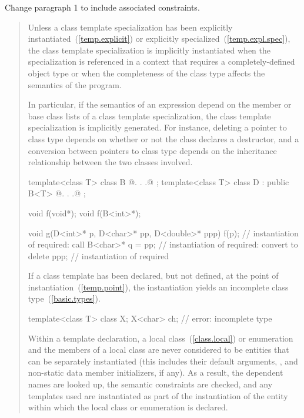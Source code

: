 Change paragraph 1 to include associated constraints.

\begin{quote}
\pnum
Unless a class template specialization has been explicitly
instantiated~(\ref{temp.explicit}) or explicitly
specialized~(\ref{temp.expl.spec}),
the class template specialization is implicitly instantiated when the
specialization is referenced in a context that requires a completely-defined
object type or when the completeness of the class type affects the semantics
of the program.
\begin{note}
In particular, if the semantics of an expression depend on the member or
base class lists of a class template specialization, the class template
specialization is implicitly generated. For instance, deleting a pointer
to class type depends on whether or not the class declares a destructor,
and a conversion between pointers to class type depends on the
inheritance relationship between the two classes involved.
\end{note}
\enterexample
\begin{codeblock}
template<class T> class B { @. . .@ };
template<class T> class D : public B<T> { @. . .@ };

void f(void*);
void f(B<int>*);

void g(D<int>* p, D<char>* pp, D<double>* ppp) {
  f(p);             // instantiation of  required: call 
  B<char>* q = pp;  // instantiation of  required: convert  to 
  delete ppp;       // instantiation of  required
}
\end{codeblock}
\exitexample
If a class template has been declared, but not defined,
at the point of instantiation~(\ref{temp.point}),
the instantiation yields an incomplete class type~(\ref{basic.types}).
\enterexample
\begin{codeblock}
template<class T> class X;
X<char> ch;         // error: incomplete type 
\end{codeblock}
\exitexample
\begin{note}
Within a template declaration,
a local class~(\ref{class.local}) or enumeration and the members of
a local class are never considered to be entities that can be separately
instantiated (this includes their default arguments, 
, and non-static data member
initializers, if any). As a result, the dependent names are looked up, the
semantic constraints are checked, and any templates used are instantiated as
part of the instantiation of the entity within which the local class or
enumeration is declared.
\end{note}
\end{quote}


